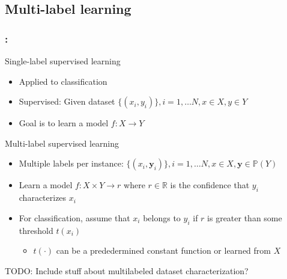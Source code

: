 \documentclass{beamer}
\begin{document}
\subsection{Multi-label learning}
\begin{frame}
\frametitle{\insertsection : \insertsubsection}
Single-label supervised learning
\begin{itemize}
	\item Applied to classification
	\item Supervised: Given dataset $\{ (x_i, y_i)\}, i = 1, \dots N, x \in X, y \in Y$
	\item Goal is to learn a model $f: X \rightarrow Y$
\end{itemize}

Multi-label supervised learning
\begin{itemize}
	\item Multiple labels per instance: $\{ (x_i, \bm{y}_i)\}, i = 1, \dots N, x \in X, \bm{y} \in \mathbb{P}(Y)$
	\item Learn a model $f: X \times Y \rightarrow r$ where $r\in \mathbb{R}$ is the confidence that $y_i$ characterizes $x_i$
	\item For classification, assume that $x_i$ belongs to $y_i$ if $r$ is greater than some threshold $t(x_i)$

		\begin{itemize}
			\item $t(\cdot)$ can be a prededermined constant function or learned from $X$
		\end{itemize}

\end{itemize}
TODO: Include stuff about multilabeled dataset characterization?
\end{frame}
\end{document}
